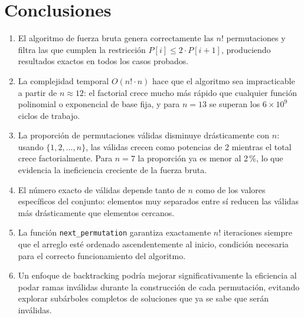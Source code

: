 \documentclass[12pt, a4paper]{article}
\begin{document}
\section{Conclusiones}

\begin{enumerate}
  \item El algoritmo de fuerza bruta genera correctamente las $n!$ permutaciones y
        filtra las que cumplen la restricción $P[i] \leq 2 \cdot P[i+1]$, produciendo
        resultados exactos en todos los casos probados.

  \item La complejidad temporal $O(n! \cdot n)$ hace que el algoritmo sea impracticable
        a partir de $n \approx 12$: el factorial crece mucho más rápido que cualquier
        función polinomial o exponencial de base fija, y para $n = 13$ se superan los
        $6 \times 10^9$ ciclos de trabajo.

  \item La proporción de permutaciones válidas disminuye drásticamente con $n$: usando
        $\{1, 2, \ldots, n\}$, las válidas crecen como potencias de 2 mientras el total
        crece factorialmente. Para $n = 7$ la proporción ya es menor al 2\,\%, lo que
        evidencia la ineficiencia creciente de la fuerza bruta.

  \item El número exacto de válidas depende tanto de $n$ como de los valores específicos
        del conjunto: elementos muy separados entre sí reducen las válidas más
        drásticamente que elementos cercanos.

  \item La función \texttt{next\_permutation} garantiza exactamente $n!$ iteraciones
        siempre que el arreglo esté ordenado ascendentemente al inicio, condición
        necesaria para el correcto funcionamiento del algoritmo.

  \item Un enfoque de backtracking podría mejorar significativamente la eficiencia al
        podar ramas inválidas durante la construcción de cada permutación, evitando
        explorar subárboles completos de soluciones que ya se sabe que serán inválidas.
\end{enumerate}
\end{document}
